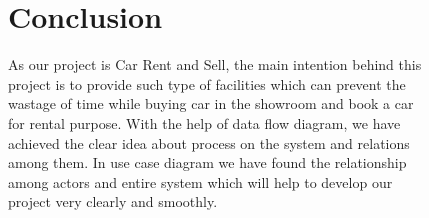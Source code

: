 \begin{figure}
\section{Conclusion}

\noindent As our project is Car Rent and Sell, the main intention behind this project is to provide such type of facilities which can prevent the wastage of time while buying car in the showroom and book a car for rental purpose. With the help of data flow diagram, we have achieved the clear idea about process on the system and relations among them. In use case diagram we have found the relationship among actors and entire system which will help to develop our project very clearly and smoothly.

\end{figure}